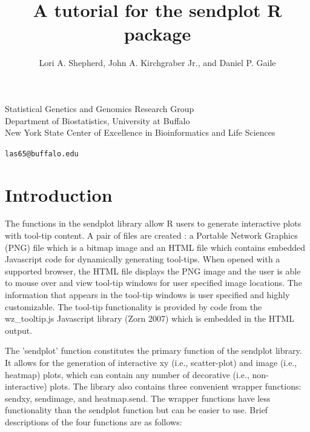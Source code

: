 \documentclass[]{article}
\title{A tutorial for the sendplot R package}
\author{Lori A. Shepherd, John A. Kirchgraber Jr., and Daniel P. Gaile}
\begin{document}
\maketitle

\begin{center}
Statistical Genetics and Genomics Research Group\\
Department of Biostatistics, University at Buffalo\\
New York State Center of Excellence in Bioinformatics and Life Sciences
\end{center}

\begin{center}

{\tt las65@buffalo.edu}
\end{center}


\tableofcontents

\section{Introduction}


\indent The functions in the sendplot library allow R users to generate interactive plots with tool-tip content. A pair of files are created : a Portable Network Graphics (PNG) file which is a bitmap image and an HTML file which contains embedded Javascript code for dynamically generating tool-tips. When opened with a supported browser, the HTML file displays the PNG image and the user is able to mouse over and view tool-tip windows for user specified image locations. The information that appears in the tool-tip windows is user specified and highly customizable. The tool-tip functionality is provided by code from the  wz\_tooltip.js Javascript library (Zorn 2007) which is embedded in the HTML output.



\indent The 'sendplot' function constitutes the primary function of the sendplot library. It allows for the generation of interactive xy (i.e., scatter-plot) and image (i.e., heatmap) plots, which can contain any number of decorative (i.e., non-interactive) plots. The library also contains three convenient wrapper functions: sendxy, sendimage, and heatmap.send. The wrapper functions have less functionality than the sendplot function but can be easier to use. Brief descriptions of the four functions are as follows:
\end{document}
